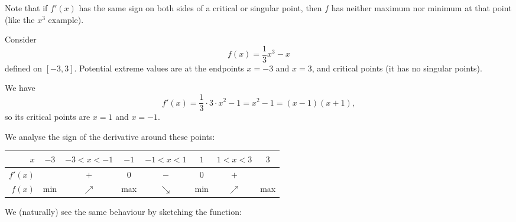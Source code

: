 \noindent
Note that if $f'(x)$ has the same sign on both sides of a critical or singular point, then $f$ has neither maximum nor minimum at that point (like the $x^3$ example).

\begin{example}
	Consider
	\[
		f(x) = \frac{1}{3} x^3 - x
	\]
	defined on $[{-3}, 3]$.
	Potential extreme values are at the endpoints $x = -3$ and $x = 3$, and critical points (it has no singular points).

	We have
	\[
		f'(x) = \frac{1}{3} \cdot 3 \cdot x^2 - 1 = x^2 - 1 = (x - 1)(x + 1),
	\]
	so its critical points are $x = 1$ and $x = -1$.

	We analyse the sign of the derivative around these points:

	\bigskip

	\begin{table}[ht!]
		\centering
		\begin{tabular}{r|*{7}{c}}
			$x$     & $-3$ & $-3 < x < -1$ & $-1$ & $-1 < x < 1$ & $1$ & $1 < x < 3$ & $3$ \\ \hline
			$f'(x)$ &      & $+$           & $0$  & $-$          & $0$ & $+$         &     \\
			$f(x)$  & min  & $\nearrow$    & max  & $\searrow$   & min & $\nearrow$  & max
		\end{tabular}
	\end{table}

	\bigskip

	\noindent
	We (naturally) see the same behaviour by sketching the function:

	\bigskip

	\begin{figure}[ht!]
		\centering
	\end{figure}
\end{example}

